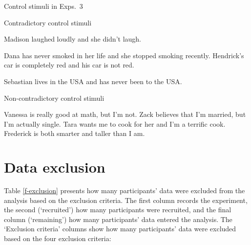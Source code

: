 \documentclass[11pt,fleqn]{article}
\newcommand{\6}{\mbox{$[\hspace*{-.6mm}[$}}
\newcommand{\9}{\mbox{$]\hspace*{-.6mm}]$}}
\begin{document}
\begin{exe}
 Control stimuli in Exps.~3
\begin{xlist}
\ex Contradictory control stimuli
\begin{xlist}
\ex Madison laughed loudly and she didn't laugh.

\ex Dana has never smoked in her life and she stopped smoking recently.
\ex Hendrick's car is completely red and his car is not red.

\ex Sebastian lives in the USA and has never been to the USA.
\end{xlist}

\ex Non-contradictory control stimuli
\begin{xlist}
\ex Vanessa is really good at math, but I'm not.
\ex Zack believes that I'm married, but I'm actually single.
\ex Tara wants me to cook for her and I'm a terrific cook.
\ex Frederick is both smarter and taller than I am.

\end{xlist}
\end{xlist}
\end{exe}


\section{Data exclusion}\label{a-excl}

Table \ref{f-exclusion} presents how many participants' data were excluded from the analysis based on the exclusion criteria. The first column records the experiment, the second (`recruited') how many participants were recruited, and the final column (`remaining') how many participants' data entered the analysis. The `Exclusion criteria' columns show how many participants' data were excluded based on the four exclusion criteria: 
\end{document}
